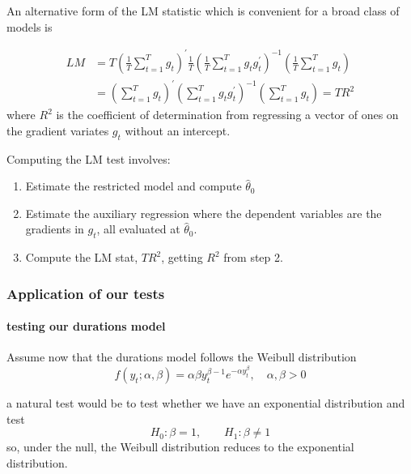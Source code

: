 \documentclass[11pt]{article}
\begin{document}
An alternative form of the LM statistic which is convenient for a broad class of models is

\begin{equation}
\begin{aligned}
L M & =T\left(\frac{1}{T} \sum_{t=1}^T g_t\right)^{\prime} \frac{1}{T}\left(\frac{1}{T} \sum_{t=1}^T g_t g_t^{\prime}\right)^{-1}\left(\frac{1}{T} \sum_{t=1}^T g_t\right) \\
& =\left(\sum_{t=1}^T g_t\right)^{\prime}\left(\sum_{t=1}^T g_t g_t^{\prime}\right)^{-1}\left(\sum_{t=1}^T g_t\right)=T R^2
\end{aligned}
\end{equation}
where $R^2$ is the coefficient of determination from regressing a vector of ones on the gradient variates $g_t$ without an intercept.

\begin{procedure}
    Computing the LM test involves:
    \begin{enumerate}
        \item Estimate the restricted model and compute $\hat{\theta}_0$
        \item Estimate the auxiliary regression where the dependent variables are the gradients in $g_t$, all evaluated at $\hat{\theta}_0$.
        \item Compute the LM stat, $TR^2$, getting $R^2$ from step 2.
    \end{enumerate}
\end{procedure}

\subsubsection{Application of our tests}

\paragraph{testing our durations model} \mbox{}

Assume now that the durations model follows the Weibull distribution
\begin{equation}
f\left(y_t ; \alpha, \beta\right)=\alpha \beta y_t^{\beta-1} e^{-\alpha y_t^\beta}, \quad \alpha, \beta>0
\end{equation}

a natural test would be to test whether we have an exponential distribution and test
\[H_0: \beta=1, \qquad H_1: \beta\neq1\]
so, under the null, the Weibull distribution reduces to the exponential distribution.
\end{document}
